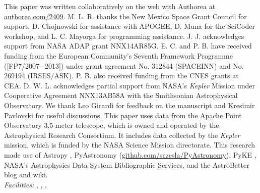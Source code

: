 \acknowledgments
This paper was written collaboratively on the web with Authorea at \url{authorea.com/2409}. M. L. R. thanks the New Mexico Space Grant Council for support, D. Chojnowski for assistance with APOGEE, D. Muna for the SciCoder workshop, and L. C. Mayorga for programming assistance. J. J. acknowledges support from NASA ADAP grant NNX14AR85G. E. C. and P. B. have received funding from the European Community's Seventh Framework Programme ([FP7/2007−2013]) under grant agreement No. 312844 (SPACEINN) and No. 269194 (IRSES/ASK). P. B. also received funding from the CNES grants at CEA. D. W. L. acknowledges partial support from NASA's \emph{Kepler} Mission under Cooperative Agreement NNX13AB58A with the Smithsonian Astrophysical Observatory. We thank Leo Girardi for feedback on the manuscript and Kresimir Pavlovski for useful discussions. This paper uses data from the Apache Point Observatory 3.5-meter telescope, which is owned and operated by the Astrophysical Research Consortium. It includes data collected by the \emph{Kepler} mission, which is funded by the NASA Science Mission directorate. This research made use of Astropy \citep{astropy}, PyAstronomy (\url{github.com/sczesla/PyAstronomy}), PyKE \citep{pyke}, NASA's Astrophysics Data System Bibliographic Services, and the AstroBetter blog and wiki.
\\

{\it Facilities:} , , , 

  